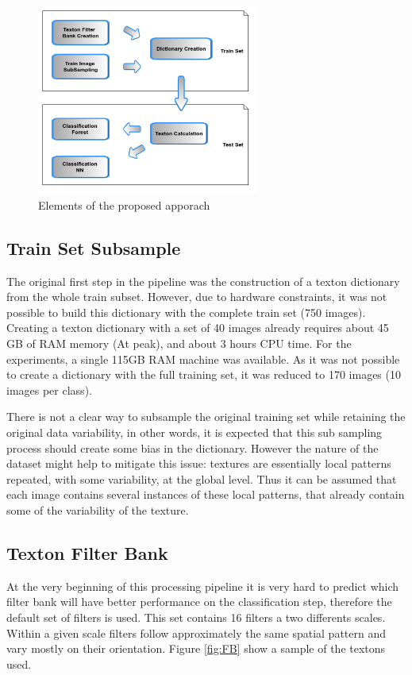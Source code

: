 \documentclass[10pt,twocolumn,letterpaper]{article}
\begin{document}
\begin{figure}
\begin{center}
\includegraphics[width=0.65\textwidth]{img/Pipeline.png}
\end{center}
\caption{Elements of the proposed apporach}
\label{fig:pipeline}
\end{figure}

\subsection{Train Set Subsample}
The original first step in the pipeline was the construction of a texton dictionary from the whole train subset.  However, due to hardware constraints, it was not possible to build this dictionary with the complete train set (750 images). Creating a texton dictionary with a set of 40 images already requires about 45 GB of RAM memory (At peak), and about 3 hours CPU time. For the experiments, a single 115GB RAM machine was available. As it was not possible to create a dictionary with the full training set, it was reduced to 170 images (10 images per class).

There is not a clear way to subsample the original training set while retaining the original data variability, in other words, it is expected that this sub sampling process should create some bias in the dictionary. However the nature of the dataset might help to mitigate this issue: textures are essentially local patterns repeated, with some variability, at the global level. Thus it can be assumed that each image contains several instances of these local patterns, that already contain some of the variability of the texture.

\subsection{Texton Filter Bank}
At the very beginning of this processing pipeline it is very hard to predict which filter bank will have better performance  on the classification step, therefore the default set of filters is used. This set contains 16 filters a two differents scales. Within a given scale filters follow approximately the same spatial pattern and vary mostly on their orientation. Figure \ref{fig:FB} show a sample of the textons used.
\end{document}
